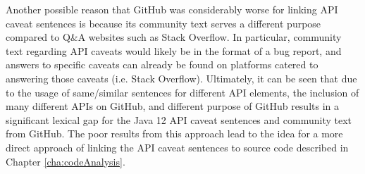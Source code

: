 Another possible reason that GitHub was considerably worse for linking API caveat sentences is because its community text serves a different purpose compared to Q\&A websites such as Stack Overflow. In particular, community text regarding API caveats would likely be in the format of a bug report, and answers to specific caveats can already be found on platforms catered to answering those caveats (i.e. Stack Overflow). Ultimately, it can be seen that due to the usage of same/similar sentences for different API elements, the inclusion of many different APIs on GitHub, and different purpose of GitHub results in a significant lexical gap for the Java 12 API caveat sentences and community text from GitHub. The poor results from this approach lead to the idea for a more direct approach of linking the API caveat sentences to source code described in Chapter \ref{cha:codeAnalysis}.

